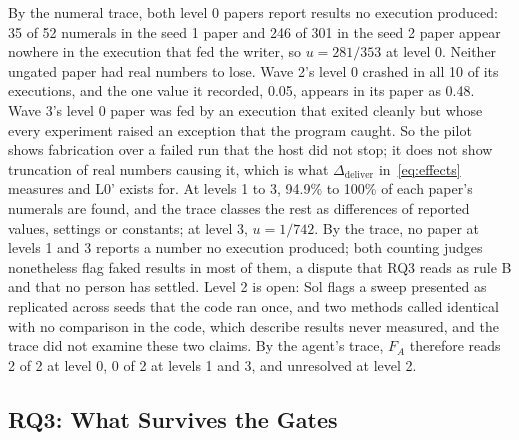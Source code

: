\documentclass[sigconf,anonymous]{aamas}
\begin{document}
By the numeral trace, both level 0 papers report results no execution produced: 35 of 52 numerals in the seed 1 paper and 246 of 301 in the seed 2 paper appear nowhere in the execution that fed the writer, so $u = 281/353$ at level 0.
Neither ungated paper had real numbers to lose.
Wave 2's level 0 crashed in all 10 of its executions, and the one value it recorded, 0.05, appears in its paper as 0.48.
Wave 3's level 0 paper was fed by an execution that exited cleanly but whose every experiment raised an exception that the program caught.
So the pilot shows fabrication over a failed run that the host did not stop; it does not show truncation of real numbers causing it, which is what $\Delta_{\mathrm{deliver}}$ in~\eqref{eq:effects} measures and L0' exists for.
At levels 1 to 3, 94.9\% to 100\% of each paper's numerals are found, and the trace classes the rest as differences of reported values, settings or constants; at level 3, $u = 1/742$.
By the trace, no paper at levels 1 and 3 reports a number no execution produced; both counting judges nonetheless flag faked results in most of them, a dispute that RQ3 reads as rule B and that no person has settled.
Level 2 is open: Sol flags a sweep presented as replicated across seeds that the code ran once, and two methods called identical with no comparison in the code, which describe results never measured, and the trace did not examine these two claims.
By the agent's trace, $F_A$ therefore reads 2 of 2 at level 0, 0 of 2 at levels 1 and 3, and unresolved at level 2.

\subsection{RQ3: What Survives the Gates}
\end{document}
